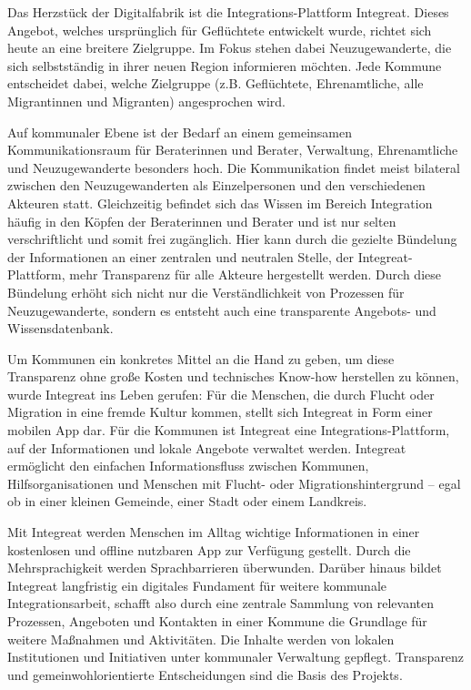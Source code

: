 \documentclass[12pt, a4paper]{article} %
\begin{document}
Das Herzstück der Digitalfabrik ist die Integrations-Plattform
Integreat. Dieses Angebot, welches ursprünglich für Geflüchtete
entwickelt wurde, richtet sich heute an eine breitere Zielgruppe. Im
Fokus stehen dabei Neuzugewanderte, die sich selbstständig in ihrer
neuen Region informieren möchten. Jede Kommune entscheidet dabei, welche
Zielgruppe (z.B. Geflüchtete, Ehrenamtliche, alle Migrantinnen und
Migranten) angesprochen wird.

Auf kommunaler Ebene ist der Bedarf an einem gemeinsamen
Kommunikationsraum für Beraterinnen und Berater, Verwaltung,
Ehrenamtliche und Neuzugewanderte besonders hoch. Die Kommunikation
findet meist bilateral zwischen den Neuzugewanderten als Einzelpersonen
und den verschiedenen Akteuren statt. Gleichzeitig befindet sich das
Wissen im Bereich Integration häufig in den Köpfen der Beraterinnen und
Berater und ist nur selten verschriftlicht und somit frei zugänglich.
Hier kann durch die gezielte Bündelung der Informationen an einer
zentralen und neutralen Stelle, der Integreat-Plattform, mehr
Transparenz für alle Akteure hergestellt werden. Durch diese Bündelung
erhöht sich nicht nur die Verständlichkeit von Prozessen für
Neuzugewanderte, sondern es entsteht auch eine transparente Angebots-
und Wissensdatenbank.

Um Kommunen ein konkretes Mittel an die Hand zu geben, um diese
Transparenz ohne große Kosten und technisches Know-how herstellen zu
können, wurde Integreat ins Leben gerufen: Für die Menschen, die durch
Flucht oder Migration in eine fremde Kultur kommen, stellt sich
Integreat in Form einer mobilen App dar. Für die Kommunen ist Integreat
eine Integrations-Plattform, auf der Informationen und lokale Angebote
verwaltet werden. Integreat ermöglicht den einfachen Informationsfluss
zwischen Kommunen, Hilfsorganisationen und Menschen mit Flucht- oder
Migrationshintergrund – egal ob in einer kleinen Gemeinde, einer Stadt
oder einem Landkreis.

Mit Integreat werden Menschen im Alltag wichtige Informationen in einer
kostenlosen und offline nutzbaren App zur Verfügung gestellt. Durch die
Mehrsprachigkeit werden Sprachbarrieren überwunden. Darüber hinaus
bildet Integreat langfristig ein digitales Fundament für weitere
kommunale Integrationsarbeit, schafft also durch eine zentrale Sammlung
von relevanten Prozessen, Angeboten und Kontakten in einer Kommune die
Grundlage für weitere Maßnahmen und Aktivitäten. Die Inhalte werden von
lokalen Institutionen und Initiativen unter kommunaler Verwaltung
gepflegt. Transparenz und gemeinwohlorientierte Entscheidungen sind die
Basis des Projekts.
\end{document}
